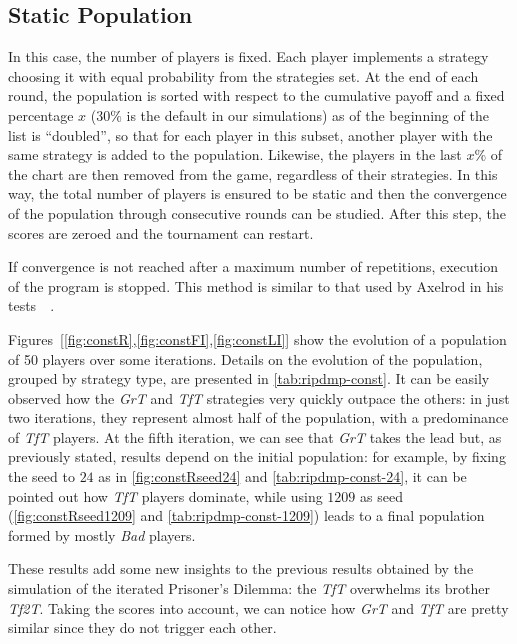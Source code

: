 \documentclass[journal,10pt,twoside]{IEEEtran}
\begin{document}
\subsection{Static Population}
In this case, the number of players is fixed. Each player implements a strategy choosing it with equal probability from the strategies set. At the end of each round, the population is sorted with respect to the cumulative payoff and a fixed percentage $x$ ($30\%$ is the default in our simulations) as of the beginning of the list is ``doubled'', so that for each player in this subset, another player with the same strategy is added to the population. Likewise, the players in the last $x\%$ of the chart are then removed from the game, regardless of their strategies. In this way, the total number of players is ensured to be static and then the convergence of the population through consecutive rounds can be studied. After this step, the scores are zeroed and the tournament can restart.

If convergence is not reached after a maximum number of repetitions, execution of the program is stopped.
This method is similar to that used by Axelrod in his tests~\cite[\S 2.6]{mathieu2017}~\cite{axelrod1984evolution}.

Figures~[\ref{fig:constR},\ref{fig:constFI},\ref{fig:constLI}] show the evolution of a population of 50 players over some iterations.
Details on the evolution of the population, grouped by strategy type, are presented in \autoref{tab:ripdmp-const}.
It can be easily observed how the \textit{GrT} and \textit{TfT} strategies very quickly outpace the others: in just two iterations, they represent almost half of the population, with a predominance of \textit{TfT} players. At the fifth iteration, we can see that \textit{GrT} takes the lead but, as previously stated, results depend on the initial population: for example, by fixing the seed to $24$ as in \autoref{fig:constRseed24} and \autoref{tab:ripdmp-const-24}, it can be pointed out how \textit{TfT} players dominate, while using $1209$ as seed (\autoref{fig:constRseed1209} and \autoref{tab:ripdmp-const-1209}) leads to a final population formed by mostly \textit{Bad} players.

These results add some new insights to the previous results obtained by the simulation of the iterated Prisoner's Dilemma: the \textit{TfT} overwhelms its brother \textit{Tf2T}. Taking the scores into account, we can notice how \textit{GrT} and \textit{TfT} are pretty similar since they do not trigger each other.
\end{document}
